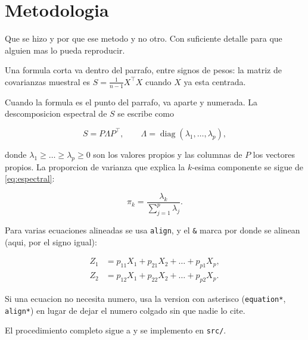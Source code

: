 
\section{Metodologia}\label{sec:metodologia}

Que se hizo y por que ese metodo y no otro. Con suficiente detalle para que
alguien mas lo pueda reproducir.

Una formula corta va dentro del parrafo, entre signos de pesos: la matriz de
covarianzas muestral es $S = \frac{1}{n-1} X^{\top} X$ cuando $X$ ya esta
centrada.

Cuando la formula es el punto del parrafo, va aparte y numerada. La
descomposicion espectral de $S$ se escribe como

\begin{equation}\label{eq:espectral}
  S = P \Lambda P^{\top},
  \qquad
  \Lambda = \operatorname{diag}(\lambda_1, \dots, \lambda_p),
\end{equation}

donde $\lambda_1 \geq \dots \geq \lambda_p \geq 0$ son los valores propios y las
columnas de $P$ los vectores propios. La proporcion de varianza que explica la
$k$-esima componente se sigue de \cref{eq:espectral}:

\begin{equation}\label{eq:varianza}
  \pi_k = \frac{\lambda_k}{\sum_{j=1}^{p} \lambda_j}.
\end{equation}

Para varias ecuaciones alineadas se usa \verb|align|, y el \verb|&| marca por
donde se alinean (aqui, por el signo igual):

\begin{align}
  Z_1 &= p_{11} X_1 + p_{21} X_2 + \dots + p_{p1} X_p, \label{eq:pc1} \\
  Z_2 &= p_{12} X_1 + p_{22} X_2 + \dots + p_{p2} X_p. \label{eq:pc2}
\end{align}

Si una ecuacion no necesita numero, usa la version con asterisco
(\verb|equation*|, \verb|align*|) en lugar de dejar el numero colgado sin que
nadie lo cite.

El procedimiento completo sigue a \textcite{hastie2009} y se implemento en
\texttt{src/}.
